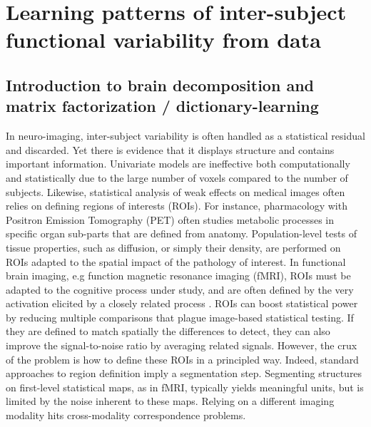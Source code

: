 \chapter{Learning patterns of inter-subject functional variability from data}



\section{Introduction to brain decomposition and matrix factorization / dictionary-learning}
\label{sec:intro}
In neuro-imaging, inter-subject variability is often handled as a statistical residual and discarded. Yet there is evidence that it displays structure and contains important information. Univariate models are ineffective both computationally and statistically due to the large number of voxels compared to the number of subjects. Likewise,
statistical analysis of weak effects on medical images often relies on
defining regions of interests (ROIs). For instance, pharmacology
with Positron Emission Tomography (PET) often studies metabolic
processes in specific organ sub-parts that are defined from anatomy.
Population-level tests of tissue properties, such as diffusion, or
simply their density, are performed on ROIs adapted to the spatial
impact of the pathology of interest. In functional brain imaging,
e.g function magnetic resonance imaging (fMRI), ROIs must be
adapted to the cognitive process under study, and are often defined by
the very activation elicited by a closely related process  \citep{saxe2006}.
ROIs can boost statistical power by reducing multiple comparisons that
plague image-based statistical testing. If they are defined to match
spatially the differences to detect, they can also improve
the signal-to-noise ratio by averaging related signals. 
%
However, the crux of
the problem is how to define these ROIs in a principled way. 
%
Indeed, standard approaches to region definition imply a
segmentation step. 
Segmenting structures on first-level statistical maps, as in fMRI,
typically yields meaningful units, but is limited by the noise
inherent to these maps.
Relying on a different imaging modality
hits cross-modality correspondence problems.



